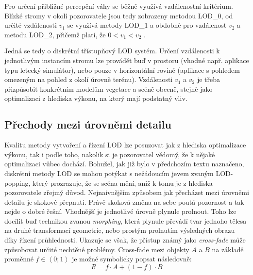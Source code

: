 Pro určení přibližné percepční váhy se běžně využívá vzdálenostní kritérium. Blízké stromy v okolí pozorovatele jsou tedy zobrazeny metodou LOD\_0, od určité vzdálenosti $v_1$ se využívá metody LOD\_1 a obdobně pro vzdálenost $v_2$ a metodu LOD\_2, přičemž platí, že $0<v_1<v_2$ .

Jedná se tedy o diskrétní třístupňový LOD systém. Určení vzdálenosti k jednotlivým instancím stromu lze provádět buď v prostoru (vhodné např. aplikace typu letecký simulátor), nebo pouze v horizontální rovině (aplikace s pohledem omezeným na pohled z okolí úrovně terénu). Vzdálenosti $v_1$ a $v_2$ je třeba přizpůsobit konkrétním modelům vegetace a scéně obecně, stejně jako optimalizaci z hlediska výkonu, na který mají podstatný vliv.

\pagebreak
\subsection{Přechody mezi úrovněmi detailu}
\label{sec-LODtransitions}
Kvalitu metody vytvoření a řízení LOD lze posuzovat jak z hlediska optimalizace výkonu, tak i podle toho, nakolik si je pozorovatel vědomý, že k nějaké optimalizaci vůbec dochází. Bohužel, jak již bylo v předchozím textu naznačeno, diskrétní metody LOD se mohou potýkat s nežádoucím jevem zvaným LOD-popping, který prozrazuje, že se scéna mění, aniž k tomu je z hlediska pozorovatele zřejmý důvod. Nejnaivnějším způsobem jak přecházet mezi úrovněmi detailu je skokové přepnutí. Právě skoková změna na sebe poutá pozornost a tak nejde o dobré řešní. Vhodnější je jednotlivé úrovně plynule prolnout. Toho lze docílit buď technikou zvanou \emph{morphing}, která plynule převádí tvar jednoho tělesa na druhé transformací geometrie, nebo prostým prolnutím výsledných obrazu díky řízení průhlednosti. Ukazuje se však, že přístup známý jako \emph{cross-fade} může způsobovat určité nechtěné problémy.  Cross-fade mezi objekty $A$ a $B$ na základě proměnné $f \in \left \langle 0;1 \right \rangle$ je možné symbolicky popsat následovně:
\begin{equation} 
R = f \cdot A + (1-f) \cdot B 
\end{equation}
